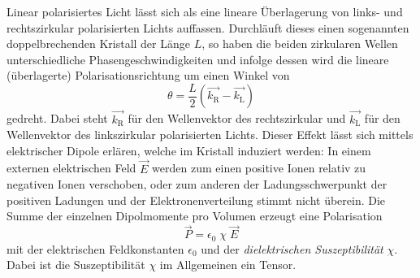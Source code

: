 Linear polarisiertes Licht lässt sich als eine lineare Überlagerung von
links- und rechtszirkular polarisierten Lichts auffassen.
Durchläuft dieses einen sogenannten doppelbrechenden Kristall der Länge $L$,
so haben die beiden zirkularen Wellen unterschiedliche Phasengeschwindigkeiten
und infolge dessen wird die lineare (überlagerte) Polarisationsrichtung
um einen Winkel von
\begin{equation}
  \theta = \frac{L}{2} \left(\vec{k_\text{R}} - \vec{k_\text{L}}\right)
  \label{eqn:Winkel-2}
\end{equation}
gedreht.
Dabei steht $\vec{k_\text{R}}$ für den Wellenvektor des rechtszirkular und
$\vec{k_\text{L}}$ für den Wellenvektor des linkszirkular polarisierten Lichts.
Dieser Effekt lässt sich mittels elektrischer Dipole erlären,
welche im Kristall induziert werden:
In einem externen elektrischen Feld $\vec{E}$ werden zum einen positive Ionen relativ
zu negativen Ionen verschoben, oder zum anderen der Ladungsschwerpunkt der
positiven Ladungen und der Elektronenverteilung stimmt nicht überein.
Die Summe der einzelnen Dipolmomente pro Volumen erzeugt eine Polarisation
\begin{equation}
  \vec{P} = \epsilon_0 \; \chi \; \vec{E}
  \label{eqn:Polarisation}
\end{equation}
mit der elektrischen Feldkonstanten $\epsilon_0$ und der
\emph{dielektrischen Suszeptibilität} $\chi$.
Dabei ist die Suszeptibilität $\chi$ im Allgemeinen ein Tensor.

